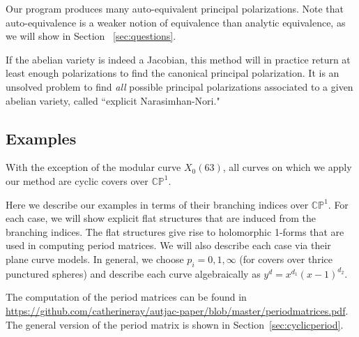 \documentclass[12pt,reqno]{amsart}
\newcommand{\C}{\mathbb{C}}
\renewcommand{\P}{\mathbb{P}}
\theoremstyle{definition}
\theoremstyle{remark}
\begin{document}
Our program produces many auto-equivalent principal polarizations.  Note that auto-equivalence is a weaker notion of equivalence than analytic equivalence, as we will show in Section ~\ref{sec:questions}. 

If the abelian variety is indeed a Jacobian, this method will in practice return at least enough polarizations to find the canonical principal polarization. It is an unsolved problem to find \textit{all} possible principal polarizations associated to a given abelian variety, called ``explicit Narasimhan-Nori."


\subsection{Examples}
\label{sec:examples}

With the exception of the modular curve $X_0(63)$, all curves on which we apply our method are cyclic covers over $\C\P^1.$ 

Here we describe our examples in terms of their branching indices over $\C\P^1.$ For each case, we will show explicit flat structures that are induced from the branching indices. The flat structures give rise to holomorphic 1-forms that are used in computing period matrices. We will also describe each case via their plane curve models. In general, we choose $p_i = 0, 1, \infty$ (for covers over thrice punctured spheres) and describe each curve algebraically as $y^d = x^{d_1} (x-1)^{d_2}.$

The computation of the period matrices can be found in \url{https://github.com/catherineray/autjac-paper/blob/master/periodmatrices.pdf}. The general version of the period matrix is shown in Section~\ref{sec:cyclicperiod}.
\end{document}
